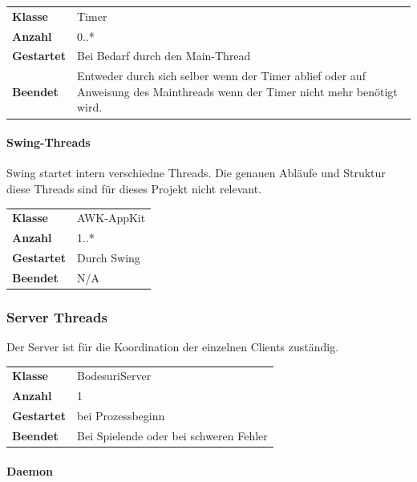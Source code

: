 \documentclass[12pt,halfparskip]{scrartcl}
\begin{document}
\begin{tabular}{@{} l p{12.5cm}}
\textbf{Klasse}       & Timer \\
\textbf{Anzahl}       & 0..* \\
\textbf{Gestartet}    & Bei Bedarf durch den Main-Thread \\
\textbf{Beendet}      & Entweder durch sich selber wenn der Timer ablief oder auf Anweisung des Mainthreads wenn der Timer nicht mehr benötigt wird. 
\end{tabular}


\paragraph{Swing-Threads} %
\label{ssub:swing_threads}

Swing startet intern verschiedne Threads. Die genauen Abläufe und Struktur diese Threads sind für dieses Projekt nicht relevant.

\begin{tabular}{@{} l p{12.5cm}}
\textbf{Klasse}       & AWK-AppKit \\
\textbf{Anzahl}       & 1..* \\
\textbf{Gestartet}    & Durch Swing \\
\textbf{Beendet}      & N/A
\end{tabular}


\clearpage
\subsubsection{Server Threads} %
\label{ssub:server}

Der Server ist für die Koordination der einzelnen Clients zuständig.

\begin{tabular}{@{} l p{12.5cm}}
\textbf{Klasse}       & BodesuriServer \\
\textbf{Anzahl}       & 1 \\
\textbf{Gestartet}    & bei Prozessbeginn \\
\textbf{Beendet}      & Bei Spielende oder bei schweren Fehler
\end{tabular}


\paragraph{Daemon} %
\label{ssub:daemon}
\end{document}
